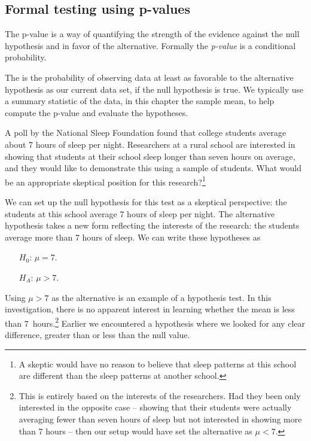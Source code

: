 \subsection{Formal testing using p-values}
\label{pValue}


The p-value is a way of quantifying the strength of the evidence against the null hypothesis and in favor of the alternative. Formally the \emph{p-value} is a conditional probability.

\begin{termBox}{
The  is the probability of observing data at least as favorable to the alternative hypothesis as our current data set, if the null hypothesis is true. We typically use a summary statistic of the data, in this chapter the sample mean, to help compute the p-value and evaluate the hypotheses.}
\end{termBox}



\begin{exercise} \label{skepticalPerspOfRuralSchoolSleepExercise}
A poll by the National Sleep Foundation found that college students average about 7 hours of sleep per night. Researchers at a rural school are interested in showing that students at their school sleep longer than seven hours on average, and they would like to demonstrate this using a sample of students. What would be an appropriate skeptical position for this research?\footnote{A skeptic would have no reason to believe that sleep patterns at this school are different than the sleep patterns at another school.}
\end{exercise}

We can set up the null hypothesis for this test as a skeptical perspective: the students at this school average 7 hours of sleep per night. The alternative hypothesis takes a new form reflecting the interests of the research: the students average more than 7 hours of sleep. We can write these hypotheses as
\begin{itemize}
\setlength{\itemsep}{0mm}
\item[$H_0$:] $\mu = 7$.
\item[$H_A$:] $\mu > 7$.
\end{itemize}
Using $\mu > 7$ as the alternative is an example of a  hypothesis test. In this investigation, there is no apparent interest in learning whether the mean is less than 7~hours.\footnote{This is entirely based on the interests of the researchers. Had they been only interested in the opposite case -- showing that their students were actually averaging fewer than seven hours of sleep but not interested in showing more than 7 hours -- then our setup would have set the alternative as $\mu < 7$.} Earlier we encountered a  hypothesis where we looked for any clear difference, greater than or less than the null value.

